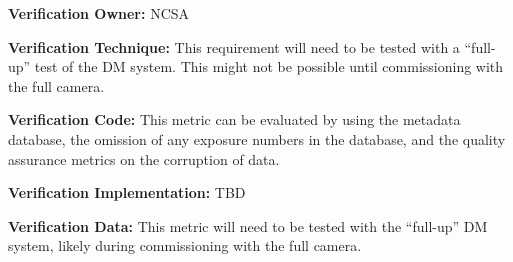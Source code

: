 \documentclass[DM,lsstdraft,toc]{lsstdoc}
\begin{document}
\textbf{Verification Owner:} NCSA

\textbf{Verification Technique:} This requirement will need to be tested
with a ``full-up'' test of the DM system. This might not be possible
until commissioning with the full camera.

\textbf{Verification Code:} This metric can be evaluated by using the
metadata database, the omission of any exposure numbers in the database,
and the quality assurance metrics on the corruption of data.

\textbf{Verification Implementation:} TBD

\textbf{Verification Data:} This metric will need to be tested with the
``full-up'' DM system, likely during commissioning with the full camera.


\end{document}
